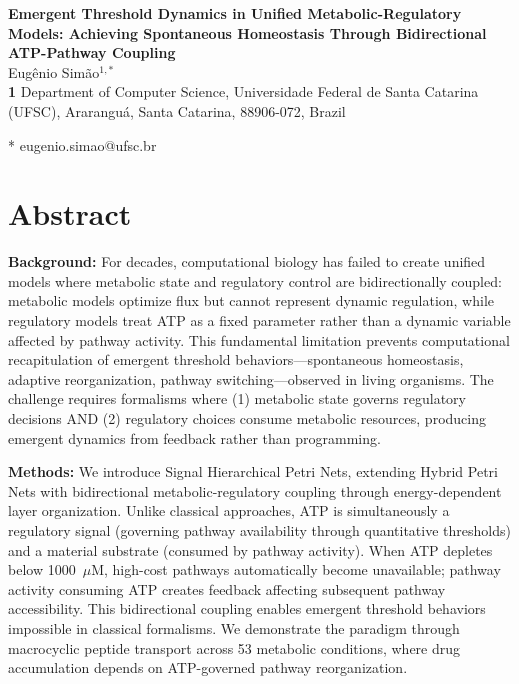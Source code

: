 \documentclass[10pt,letterpaper]{article}
\begin{document}
\vspace*{0.2in}

\begin{flushleft}
{\Large
\textbf{Emergent Threshold Dynamics in Unified Metabolic-Regulatory Models: Achieving Spontaneous Homeostasis Through Bidirectional ATP-Pathway Coupling}
}
\newline
\\
Eug\^enio Sim\~ao$^{1,*}$
\\
\bigskip
\textbf{1} Department of Computer Science, Universidade Federal de Santa Catarina (UFSC), Ararangu\'a, Santa Catarina, 88906-072, Brazil
\\
\bigskip

* eugenio.simao@ufsc.br

\end{flushleft}

\section*{Abstract}
\textbf{Background:} For decades, computational biology has failed to create unified models where metabolic state and regulatory control are bidirectionally coupled: metabolic models optimize flux but cannot represent dynamic regulation, while regulatory models treat ATP as a fixed parameter rather than a dynamic variable affected by pathway activity. This fundamental limitation prevents computational recapitulation of emergent threshold behaviors—spontaneous homeostasis, adaptive reorganization, pathway switching—observed in living organisms. The challenge requires formalisms where (1) metabolic state governs regulatory decisions AND (2) regulatory choices consume metabolic resources, producing emergent dynamics from feedback rather than programming.

\textbf{Methods:} We introduce Signal Hierarchical Petri Nets, extending Hybrid Petri Nets with bidirectional metabolic-regulatory coupling through energy-dependent layer organization. Unlike classical approaches, ATP is simultaneously a regulatory signal (governing pathway availability through quantitative thresholds) and a material substrate (consumed by pathway activity). When ATP depletes below 1000~$\mu$M, high-cost pathways automatically become unavailable; pathway activity consuming ATP creates feedback affecting subsequent pathway accessibility. This bidirectional coupling enables emergent threshold behaviors impossible in classical formalisms. We demonstrate the paradigm through macrocyclic peptide transport across 53 metabolic conditions, where drug accumulation depends on ATP-governed pathway reorganization.
\end{document}
